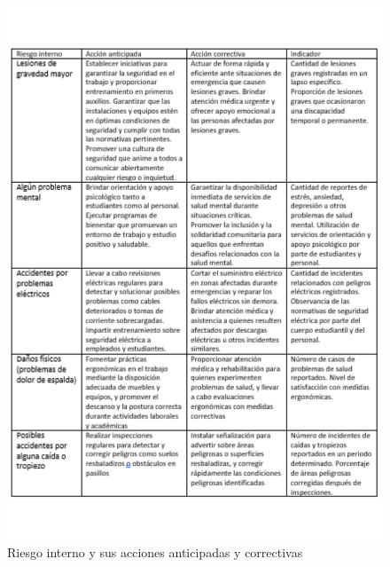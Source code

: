     \begin{figure}[H]
        \centering
        \includegraphics[scale=0.25]{30/img/Tablota de riesgos int.pdf}
        \caption{Riesgo interno y sus acciones anticipadas y correctivas}
    \end{figure}
